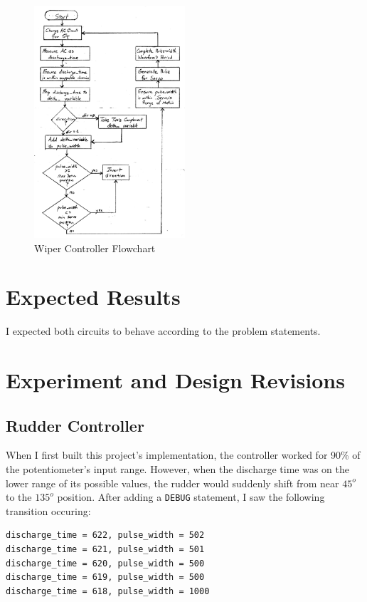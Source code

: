 \documentclass[11pt]{article}
\begin{document}
\begin{figure}[ht]
\centering
\includegraphics[width=0.5\textwidth]{wiper-flowchart.pdf}
\caption{Wiper Controller Flowchart}
\label{wiper-flowchart}
\end{figure}

\section{Expected Results}

I expected both circuits to behave according to the problem statements.

\section{Experiment and Design Revisions}

\subsection{Rudder Controller}

When I first built this project's implementation, the controller worked
for 90\% of the potentiometer's input range. However, when the discharge
time was on the lower range of its possible values, the rudder would
suddenly shift from near $45^{o}$ to the $135^{o}$ position.
After adding a \texttt{DEBUG} statement, I saw the following transition
occuring:
\begin{verbatim}
discharge_time = 622, pulse_width = 502
discharge_time = 621, pulse_width = 501
discharge_time = 620, pulse_width = 500
discharge_time = 619, pulse_width = 500
discharge_time = 618, pulse_width = 1000
\end{verbatim}
\end{document}
